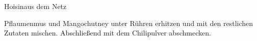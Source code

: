 \begin{recipe}{Hoisin}{aus dem Netz}\label{Hoisin}
  \inglist

  \steps
  Pflaumenmus und Mangochutney unter Rühren erhitzen und mit den restlichen
  Zutaten mischen. Abschließend mit dem Chilipulver abschmecken.
\end{recipe}
